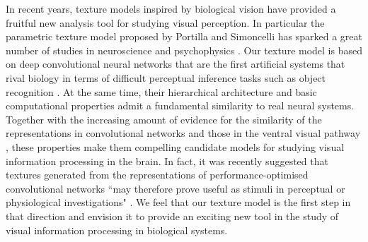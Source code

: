 \documentclass{article} %
\begin{document}
In recent years, texture models inspired by biological vision have provided a fruitful new analysis tool for studying visual perception. In particular the parametric texture model proposed by Portilla and Simoncelli \cite{portilla_parametric_2000} has sparked a great number of studies in neuroscience and psychophysics \cite{freeman_functional_2013, freeman_metamers_2011, balas_summary-statistic_2009, rosenholtz_summary_2012, okazawa_image_2015}. Our texture model is based on deep convolutional neural networks that are the first artificial systems that rival biology in terms of difficult perceptual inference tasks such as object recognition \cite{krizhevsky_imagenet_2012, simonyan_very_2014, szegedy_going_2014}. At the same time, their hierarchical architecture and basic computational properties admit a fundamental similarity to real neural systems. Together with the increasing amount of evidence for the similarity of the representations in convolutional networks and those in the ventral visual pathway \cite{yamins_performance-optimized_2014, cadieu_deep_2014, khaligh-razavi_deep_2014}, these properties make them compelling candidate models for studying visual information processing in the brain. In fact, it was recently suggested that textures generated from the representations of performance-optimised convolutional networks ``may therefore prove useful as stimuli in perceptual or physiological investigations" \cite{movshon_representation_2015}. We feel that our texture model is the first step in that direction and envision it to provide an exciting new tool in the study of visual information processing in biological systems.








\end{document}
